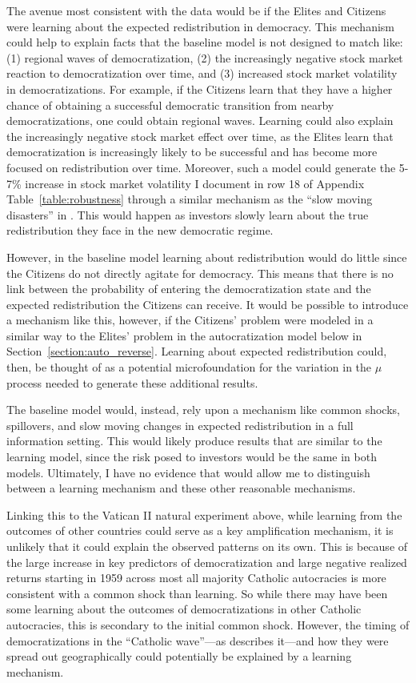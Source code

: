 \documentclass[12pt]{article}
\numberwithin{equation}{section}
\begin{document}
The avenue most consistent with the data would be if the Elites and Citizens were learning about the expected redistribution in democracy.  This mechanism could help to explain facts that the baseline model is not designed to match like: (1) regional waves of democratization, (2) the increasingly negative stock market reaction to democratization over time, and (3) increased stock market volatility in democratizations. For example, if the Citizens learn that they have a higher chance of obtaining a successful democratic transition from nearby democratizations, one could obtain regional waves. Learning could also explain the increasingly negative stock market effect over time, as the Elites learn that democratization is increasingly likely to be successful and has become more focused on redistribution over time. Moreover, such a model could generate the 5-7\% increase in stock market volatility I document in row 18 of Appendix Table~\ref{table:robustness} through a similar mechanism as the ``slow moving disasters'' in \cite*{Ghaderi2022}. This would happen as investors slowly learn about the true redistribution they face in the new democratic regime.

However, in the baseline model learning about redistribution would do little since the Citizens do not directly agitate for democracy. This means that there is no link between the probability of entering the democratization state and the expected redistribution the Citizens can receive.  It would be possible to introduce a mechanism like this, however, if the Citizens' problem were modeled in a similar way to the Elites' problem in the autocratization model below in Section~\ref{section:auto_reverse}. Learning about expected redistribution could, then, be thought of as a potential microfoundation for the variation in the $\mu$ process needed to generate these additional results.

The baseline model would, instead, rely upon a mechanism like common shocks, spillovers, and slow moving changes in expected redistribution in a full information setting.  This would likely produce results that are similar to the learning model, since the risk posed to investors would be the same in both models. Ultimately,  I have no evidence that would allow me to distinguish between a learning mechanism and these other reasonable mechanisms.

Linking this to the Vatican II natural experiment above, while learning from the outcomes of other countries could serve as a key amplification mechanism, it is unlikely that it could explain the observed patterns on its own. This is because of the large increase in key predictors of democratization and large negative realized returns starting in 1959 across most all majority Catholic autocracies is more consistent with a common shock than learning. So while there may have been some learning about the outcomes of democratizations in other Catholic autocracies, this is secondary to the initial common shock.  However, the timing of democratizations in the ``Catholic wave''---as \cite{Philpott2004} describes it---and how they were spread out geographically could potentially be explained by a learning mechanism.
\end{document}
